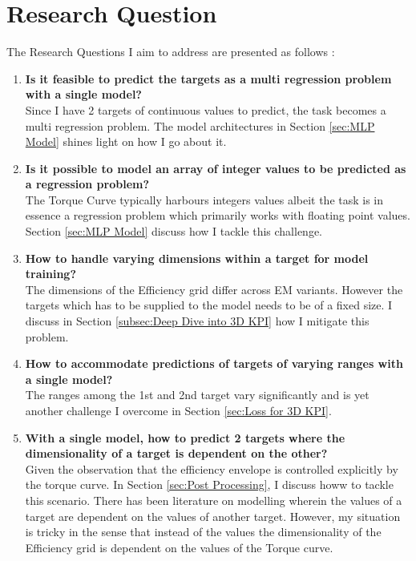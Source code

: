 \documentclass{report} %
\begin{document}
\section{Research Question}\label{sec:Research Question}

The Research Questions I aim to address are presented as follows :
 
\begin{enumerate}[nosep]
    \item \textbf{Is it feasible to predict the targets as a multi regression problem with a single model?}\\
    Since I have 2 targets of continuous values to predict, the task becomes a multi regression problem. The model architectures in Section \ref{sec:MLP Model} 
    shines light on how I go about it.
    \item \textbf{Is it possible to model an array of integer values to be predicted as a regression problem?}\\
    The Torque Curve typically harbours integers values albeit the task is in essence a regression problem which primarily works with floating point values. 
    Section \ref{sec:MLP Model} discuss how I tackle this challenge. 
    \item \textbf{How to handle varying dimensions within a target for model training?}\\
    The dimensions of the Efficiency grid differ across \ac{EM} variants. However the targets which has to be supplied to the model needs to be of a fixed size.
    I discuss in Section \ref{subsec:Deep Dive into 3D KPI} how I mitigate this problem.
    \item \textbf{How to accommodate predictions of targets of varying ranges with a single model?}\\
    The ranges among the 1st and 2nd target vary significantly and is yet another challenge I overcome in Section \ref{sec:Loss for 3D KPI}.
    \item \textbf{With a single model, how to predict 2 targets where the dimensionality of a target is dependent on the other?}\\
    Given the observation that the efficiency envelope is controlled explicitly by the torque curve. In Section \ref{sec:Post Processing}, I discuss howw to tackle this scenario.
    There has been literature on modelling wherein the values of a target are dependent on the values of another target. However, my situation is tricky in the sense 
    that instead of the values the dimensionality of the Efficiency grid is dependent on the values of the Torque curve.
\end{enumerate}
\end{document}
